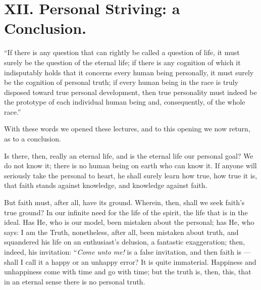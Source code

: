 \documentclass[12pt,a4paper]{book}
\begin{document}
\chapter*{XII. Personal Striving: a Conclusion.}
\label{ch:forel12}

``If there is any question that can rightly be called a question of life, it must surely be the question of the eternal life; if there is any cognition of which it indisputably holds that it concerns every human being personally, it must surely be the cognition of personal truth; if every human being in the race is truly disposed toward true personal development, then true personality must indeed be the prototype of each individual human being and, consequently, of the whole race.''

With these words we opened these lectures, and to this opening we now return, as to a conclusion.

Is there, then, really an eternal life, and is the eternal life our personal goal? We do not know it; there is no human being on earth who can know it. If anyone will seriously take the personal to heart, he shall surely learn how true, how true it is, that faith stands against knowledge, and knowledge against faith.

But faith must, after all, have its ground. Wherein, then, shall we seek faith's true ground? In our infinite need for the life of the spirit, the life that is in the ideal. Has He, who is our model, been mistaken about the personal; has He, who
says: I am the Truth, nonetheless, after all, been mistaken about truth, and squandered his life on an enthusiast's delusion, a fantastic exaggeration; then, indeed, his invitation: ``\emph{Come unto me!} is a false invitation, and then faith is --- shall I call it a happy or an unhappy error? It is quite immaterial. Happiness and unhappiness come with time and go with time; but the truth is, then, this, that in an eternal sense there is no personal truth.
\end{document}
